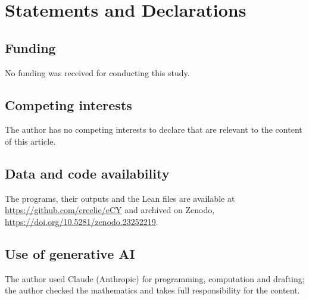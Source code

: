 \documentclass[11pt]{amsart}
\theoremstyle{definition}
\theoremstyle{remark}
\numberwithin{equation}{section}
\providecommand{\doi}[1]{\url{https://doi.org/#1}}
\begin{document}
\section*{Statements and Declarations}

\subsection*{Funding} No funding was received for conducting this study.

\subsection*{Competing interests} The author has no competing interests to declare that are relevant to the content of this article.

\subsection*{Data and code availability} The programs, their outputs and the Lean files are available at \url{https://github.com/creelie/eCY} and archived on Zenodo, \doi{10.5281/zenodo.23252219}.

\subsection*{Use of generative AI} The author used Claude (Anthropic) for programming, computation and drafting; the author checked the mathematics and takes full responsibility for the content.
\end{document}
